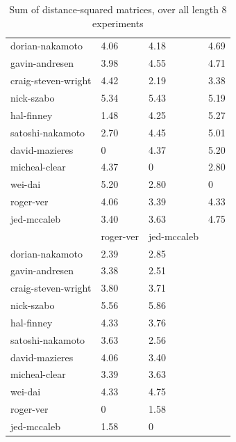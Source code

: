\documentclass{article}%
\begin{document}
\begin{table}[]
\begin{tabular}{llll}
dorian-nakamoto     & 4.06     & 4.18    & 4.69         \\
gavin-andresen      & 3.98     & 4.55   & 4.71         \\
craig-steven-wright & 4.42       & 2.19   & 3.38         \\
nick-szabo          & 5.34     & 5.43    & 5.19         \\
hal-finney          & 1.48   & 4.25    & 5.27         \\
satoshi-nakamoto    & 2.70      & 4.45  & 5.01         \\
david-mazieres      & 0               & 4.37   & 5.20         \\
micheal-clear       & 4.37   & 0              & 2.80        \\
wei-dai             & 5.20     & 2.80    & 0                   \\
roger-ver           & 4.06  & 3.39    & 4.33        \\
jed-mccaleb         & 3.40     & 3.63    & 4.75         \\
                    & roger-ver       & jed-mccaleb    &                     \\
dorian-nakamoto     & 2.39     & 2.85    &                     \\
gavin-andresen      & 3.38    & 2.51    &                     \\
craig-steven-wright & 3.80     & 3.71    &                     \\
nick-szabo          & 5.56    & 5.86    &                     \\
hal-finney          & 4.33     & 3.76   &                     \\
satoshi-nakamoto    & 3.63       & 2.56    &                     \\
david-mazieres      & 4.06   & 3.40   &                     \\
micheal-clear       & 3.39     & 3.63   &                     \\
wei-dai             & 4.33     & 4.75    &                     \\
roger-ver           & 0               & 1.58    &                     \\
jed-mccaleb         & 1.58    & 0              &                    
\end{tabular}

\caption{Sum of distance-squared matrices, over all length 8 experiments}
\end{table}
\end{document}
